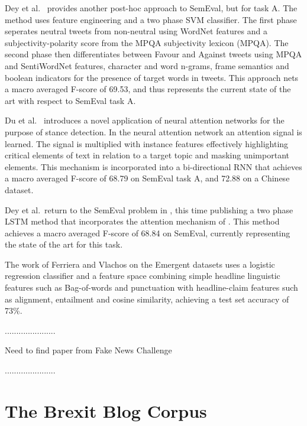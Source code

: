 \documentclass[Dissertation.tex]{subfiles}
\begin{document}
Dey et al.\ \cite{deyTwitterStanceDetection2017} provides another post-hoc approach to SemEval, but for task A. The method uses feature engineering and a two phase SVM classifier. The first phase seperates neutral tweets from non-neutral using WordNet \cite{WordNetLexicalDatabase} features and a subjectivity-polarity score from the MPQA subjectivity lexicon \cite{SubjectivityLexiconMPQA} (MPQA). The second phase then differentiates between Favour and Against tweets using MPQA and SentiWordNet \cite{SentiWordNet} features, character and word n-grams, frame semantics and boolean indicators for the presence of target words in tweets. This approach nets a macro averaged F-score of 69.53, and thus represents the current state of the art with respect to SemEval task A.

Du et al.\ \cite{duStanceClassificationTargetspecific} introduces a novel application of neural attention networks for the purpose of stance detection. In the neural attention network an attention signal is learned. The signal is multiplied with instance features effectively highlighting critical elements of text in relation to a target topic and masking unimportant elements. This mechanism is incorporated into a bi-directional RNN that achieves a macro averaged F-score of 68.79 on SemEval task A, and 72.88 on a Chinese dataset.

Dey et al.\ return to the SemEval problem in \cite{deyTopicalStanceDetection2018}, this time publishing a two phase LSTM method that incorporates the attention mechanism of \cite{duStanceClassificationTargetspecific}. This method achieves a macro averaged F-score of 68.84 on SemEval, currently representing the state of the art for this task.


The work of Ferriera and Vlachos \cite{ferreiraEmergentNovelDataset2016} on the Emergent datasets uses a logistic regression classifier and a feature space combining simple headline linguistic features such as Bag-of-words and punctuation with headline-claim features such as alignment, entailment and cosine similarity, achieving a test set accuracy of 73\%.


......................

Need to find paper from Fake News Challenge

......................
	\section{The Brexit Blog Corpus}\label{BBC}
\end{document}
